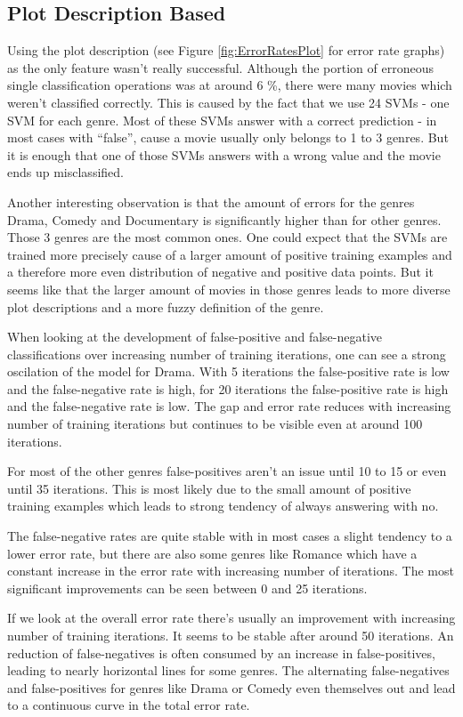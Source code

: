 \documentclass{vldb}
\begin{document}
\subsection{Plot Description Based}
\par Using the plot description (see Figure \ref{fig:ErrorRatesPlot} for error rate graphs) as the only feature wasn’t really successful. Although the portion of erroneous single classification operations was at around 6 \%, there were many movies which weren’t classified correctly. This is caused by the fact that we use 24 SVMs - one SVM for each genre. Most of these SVMs answer with a correct prediction - in most cases with “false”, cause a movie usually only belongs to 1 to 3 genres. But it is enough that one of those SVMs answers with a wrong value and the movie ends up misclassified.
\par Another interesting observation is that the amount of errors for the genres Drama, Comedy and Documentary is significantly higher than for other genres. Those 3 genres are the most common ones. One could expect that the SVMs are trained more precisely cause of a larger amount of positive training examples and a therefore more even distribution of negative and positive data points. But it seems like that the larger amount of movies in those genres leads to more diverse plot descriptions and a more fuzzy definition of the genre.
\par When looking at the development of false-positive and false-negative classifications over increasing number of training iterations, one can see a strong oscilation of the model for Drama. With 5 iterations the false-positive rate is low and the false-negative rate is high, for 20 iterations the false-positive rate is high and the false-negative rate is low. The gap and error rate reduces with increasing number of training iterations but continues to be visible even at around 100 iterations.
\par For most of the other genres false-positives aren’t an issue until 10 to 15 or even until 35 iterations. This is most likely due to the small amount of positive training examples which leads to strong tendency of always answering with no.
\par The false-negative rates are quite stable with in most cases a slight tendency to a lower error rate, but there are also some genres like Romance which have a constant increase in the error rate with increasing number of iterations. The most significant improvements can be seen between 0 and 25 iterations.
\par If we look at the overall error rate there’s usually an improvement with increasing number of training iterations. It seems to be stable after around 50 iterations. An reduction of false-negatives is often consumed by an increase in false-positives, leading to nearly horizontal lines for some genres. The alternating false-negatives and false-positives for genres like Drama or Comedy even themselves out and lead to a continuous curve in the total error rate.
\end{document}
